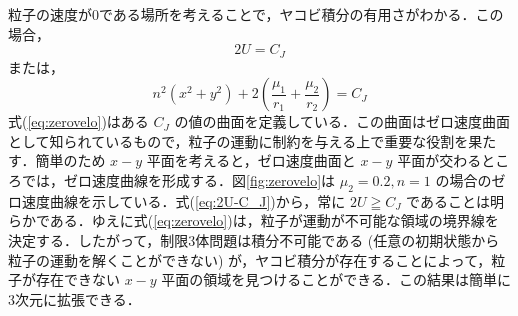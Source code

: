 \documentclass[11pt,a4paper,oneside,onecolumn]{jreport}
\begin{document}
粒子の速度が0である場所を考えることで，ヤコビ積分の有用さがわかる．この場合，
\begin{equation}
2 U = C_J
\end{equation}
または，
\begin{equation}
n^2 (x^2 + y^2) + 2 \left( \frac{\mu_1}{r_1} + \frac{\mu_2}{r_2} \right) = C_J \label{eq:zerovelo}
\end{equation}
式(\ref{eq:zerovelo})はある $C_J$ の値の曲面を定義している．この曲面はゼロ速度曲面として知られているもので，粒子の運動に制約を与える上で重要な役割を果たす．簡単のため $x-y$ 平面を考えると，ゼロ速度曲面と $x-y$ 平面が交わるところでは，ゼロ速度曲線を形成する．図\ref{fig:zerovelo}は $\mu_2 = 0.2, n = 1$ の場合のゼロ速度曲線を示している．式(\ref{eq:2U-C_J})から，常に $2 U \geqq C_J$ であることは明らかである．ゆえに式(\ref{eq:zerovelo})は，粒子が運動が不可能な領域の境界線を決定する．したがって，制限3体問題は積分不可能である (任意の初期状態から粒子の運動を解くことができない) が，ヤコビ積分が存在することによって，粒子が存在できない $x-y$ 平面の領域を見つけることができる．この結果は簡単に3次元に拡張できる．
\end{document}
